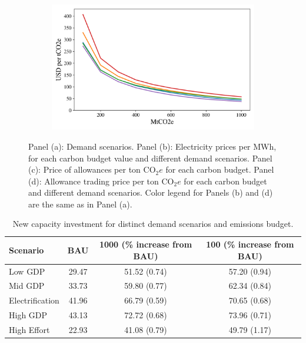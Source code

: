 \documentclass[11pt, letterpaper]{article}
\begin{document}
\begin{figure}[ht]
\begin{subfigure}[t]{0.5\linewidth}
    \caption{  }
  \label{fig:price_allo}
  \end{subfigure}
    \begin{subfigure}[t]{0.5\linewidth}
    \includegraphics[width=\textwidth]{Figures/prices_trading_scenarios.png}
    \caption{}
  \label{fig:price_trade}
  \end{subfigure}\quad
   \caption{Panel (a): Demand scenarios. Panel (b): Electricity prices per MWh, for each carbon budget value and different demand scenarios. Panel (c): Price of allowances per ton CO$_2e$ for each carbon budget. Panel (d): Allowance trading price per ton CO$_2e$ for each carbon budget and different demand scenarios. Color legend for Panels (b) and (d) are the same as in Panel (a).}
\end{figure}

\small
\begin{table}[h]
    \centering
    \begin{tabular}{ l| c c c   } 
\hline
Scenario	    &	BAU    	&	1000 (\% increase from BAU)	    &	100 (\% increase from BAU)	        \\
\hline
Low GDP	        &	29.47	&	51.52 (0.74)	&	57.20 (0.94)	\\
Mid GDP 	    &	33.73	&	59.80 (0.77)	&	62.34 (0.84) 	\\
Electrification	&	41.96	&	66.79 (0.59)	&	70.65 (0.68)	\\
High GDP	    &	43.13	&	72.72 (0.68)	&	73.96 (0.71)	\\
High Effort	    &	22.93   &	41.08 (0.79)	&	49.79 (1.17)	\\
\hline
\end{tabular}
    \caption{New capacity investment for distinct demand scenarios and emissions budget.}
    \label{tab:InvestmentStoch}
\end{table}
\normalsize
\end{document}
